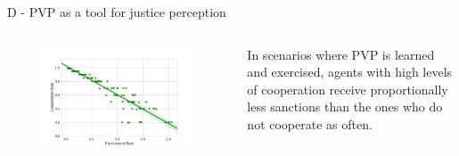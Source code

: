 \documentclass[xcolor={table}]{beamer}
\begin{document}
\begin{frame}[fragile=singleslide,t]
\begin{columns}[T]
\begin{column}{.47\textwidth}
\begin{block}{D - PVP as a tool for justice perception}
\begin{columns}[c]
\begin{column}{.7\textwidth}
\begin{figure}
  \centering
  \includegraphics[width=1.1\linewidth]{img/exp3.pdf}%
  \label{resppercep}
\end{figure}

\end{column}
\begin{column}{.3\textwidth}


In scenarios where PVP is learned and exercised, agents with high levels of cooperation receive proportionally less sanctions than the ones who do not cooperate as often.


\end{column}
\end{columns}
\end{block}



\end{column}
\end{columns}


\end{frame}
\end{document}
